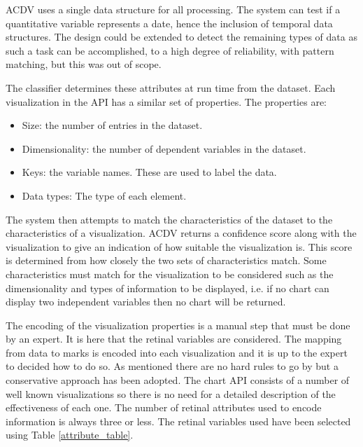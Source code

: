 \documentclass[a4paper, 11pt, titlepage, onehalfspacing]{report}
\begin{document}
AC\lightning{}DV uses a single data structure for all processing. The system can test if a quantitative variable represents a date, hence the inclusion of temporal data structures. The design could be extended to detect the remaining types of data as such a task can be accomplished, to a high degree of reliability, with pattern matching, but this was out of scope.

The classifier determines these attributes at run time from the dataset. Each visualization in the API has a similar set of properties. The properties are:
\begin{itemize}
\item Size: the number of entries in the dataset.
\item Dimensionality: the number of dependent variables in the dataset.
\item Keys: the variable names. These are used to label the data.
\item Data types: The type of each element. 
\end{itemize}
The system then attempts to match the characteristics of the dataset to the characteristics of a visualization. AC\lightning{}DV returns a confidence score along with the visualization to give an indication of how suitable the visualization is. This score is determined from how closely the two sets of characteristics match. Some characteristics must match for the visualization to be considered such as the dimensionality and types of information to be displayed, i.e. if no chart can display two independent variables then no chart will be returned.

The encoding of the visualization properties is a manual step that must be done by an expert. It is here that the retinal variables are considered. The mapping from data to marks is encoded into each visualization and it is up to the expert to decided how to do so. As mentioned there are no hard rules to go by but a conservative approach has been adopted. The chart API consists of a number of well known visualizations so there is no need for a detailed description of the effectiveness of each one. The number of retinal attributes used to encode information is always three or less. The retinal variables used have been selected using Table \ref{attribute_table}.
\end{document}
